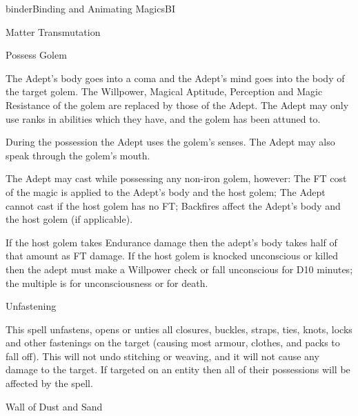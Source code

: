\begin{college}[1.1]{binder}{Binding and Animating Magics}{BI}
\begin{spell}[S-9]{Matter Transmutation}
\begin{effects}
\end{effects}
\end{spell}

\begin{spell}[S-10]{Possess Golem}

\begin{effects}
The Adept's body goes into a coma and the Adept's mind goes into the
body of the target golem.  The Willpower, Magical Aptitude, Perception
and Magic Resistance of the golem are replaced by those of the Adept.
The Adept may only use ranks in abilities which they have, and the
golem has been attuned to.

During the possession the Adept uses the golem's senses.  The Adept
may also speak through the golem's mouth.

The Adept may cast while possessing any non-iron golem, however: The
FT cost of the magic is applied to the Adept's body and the host
golem; The Adept cannot cast if the host golem has no FT; Backfires
affect the Adept's body and the host golem (if applicable).

If the host golem takes Endurance damage then the adept's body takes
half of that amount as FT damage.  If the host golem is knocked
unconscious or killed then the adept must make a Willpower check or
fall unconscious for D10 minutes; the multiple is  for
unconsciousness or  for death.
\end{effects}
\end{spell}

\begin{spell}[S-11]{Unfastening}

\begin{effects}
This spell unfastens, opens or unties all closures, buckles, straps,
ties, knots, locks and other fastenings on the target (causing most
armour, clothes, and packs to fall off).  This will not undo stitching
or weaving, and it will not cause any damage to the target.  If
targeted on an entity then all of their possessions will be affected
by the spell.
\end{effects}
\end{spell}

\begin{spell}[S-12]{Wall of Dust and Sand}


\end{spell}
\end{college}
